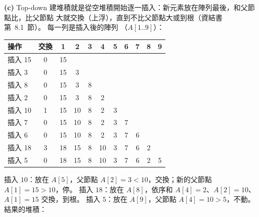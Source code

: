 \begin{pastsoln}
\textbf{(c)} Top-down 建堆積就是從空堆積開始逐一插入：新元素放在陣列最後，和父節點比，比父節點
大就交換（上浮），直到不比父節點大或到根（資結書第~8.1~節）。 每一列是插入後的陣列
（$A[1..9]$）：
\begin{center}
\begin{tabular}{lc*{9}{c}}
\toprule
操作 & 交換 & 1 & 2 & 3 & 4 & 5 & 6 & 7 & 8 & 9 \\
\midrule
插入 15 & 0 & 15 \\
插入 3 & 0 & 15 & 3 \\
插入 8 & 0 & 15 & 3 & 8 \\
插入 2 & 0 & 15 & 3 & 8 & 2 \\
插入 10 & 1 & 15 & 10 & 8 & 2 & 3 \\
插入 7 & 0 & 15 & 10 & 8 & 2 & 3 & 7 \\
插入 6 & 0 & 15 & 10 & 8 & 2 & 3 & 7 & 6 \\
插入 18 & 3 & 18 & 15 & 8 & 10 & 3 & 7 & 6 & 2 \\
插入 5 & 0 & 18 & 15 & 8 & 10 & 3 & 7 & 6 & 2 & 5 \\
\bottomrule
\end{tabular}
\end{center}
插入 $10$：放在 $A[5]$，父節點 $A[2] = 3 < 10$，交換；新的父節點 $A[1] = 15 > 10$，停。
插入 $18$：放在 $A[8]$，依序和 $A[4] = 2$、$A[2] = 10$、$A[1] = 15$ 交換，到根。 插入 $5$：放在
$A[9]$，父節點 $A[4] = 10 > 5$，不動。 結果的堆積：
\begin{center}
\end{center}


\end{pastsoln}
